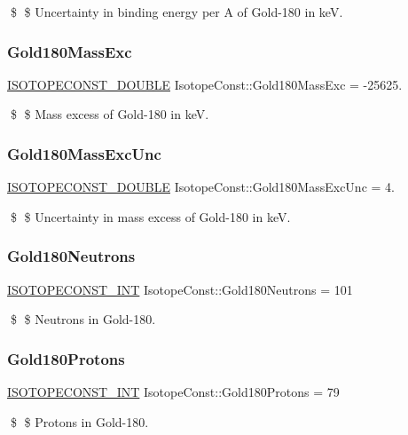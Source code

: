 \$ \$ Uncertainty in binding energy per A of Gold-\/180 in keV. \mbox{\label{group___isotope_const-_gold-_au180_gac93a89aab82e2ddeb1f7883011a1e968}} 
\subsubsection{\texorpdfstring{Gold180\+Mass\+Exc}{Gold180MassExc}}
{\footnotesize\ttfamily \mbox{\hyperlink{group___isotope_const-_macros_ga8f45a7272ce02c0b4c65c44636ed719a}{I\+S\+O\+T\+O\+P\+E\+C\+O\+N\+S\+T\+\_\+\+D\+O\+U\+B\+LE}} Isotope\+Const\+::\+Gold180\+Mass\+Exc = -\/25625.}

\$ \$ Mass excess of Gold-\/180 in keV. \mbox{\label{group___isotope_const-_gold-_au180_gad275b82ba2dd6ba87cdc403fe263988c}} 
\subsubsection{\texorpdfstring{Gold180\+Mass\+Exc\+Unc}{Gold180MassExcUnc}}
{\footnotesize\ttfamily \mbox{\hyperlink{group___isotope_const-_macros_ga8f45a7272ce02c0b4c65c44636ed719a}{I\+S\+O\+T\+O\+P\+E\+C\+O\+N\+S\+T\+\_\+\+D\+O\+U\+B\+LE}} Isotope\+Const\+::\+Gold180\+Mass\+Exc\+Unc = 4.}

\$ \$ Uncertainty in mass excess of Gold-\/180 in keV. \mbox{\label{group___isotope_const-_gold-_au180_gac6373d58975fd8445e00fe9d47a329a7}} 
\subsubsection{\texorpdfstring{Gold180\+Neutrons}{Gold180Neutrons}}
{\footnotesize\ttfamily \mbox{\hyperlink{group___isotope_const-_macros_ga5f18360b3e99483a35c32d789e62621c}{I\+S\+O\+T\+O\+P\+E\+C\+O\+N\+S\+T\+\_\+\+I\+NT}} Isotope\+Const\+::\+Gold180\+Neutrons = 101}

\$ \$ Neutrons in Gold-\/180. \mbox{\label{group___isotope_const-_gold-_au180_ga32c382cd87ec8e7c8225d2fb07df24ab}} 
\subsubsection{\texorpdfstring{Gold180\+Protons}{Gold180Protons}}
{\footnotesize\ttfamily \mbox{\hyperlink{group___isotope_const-_macros_ga5f18360b3e99483a35c32d789e62621c}{I\+S\+O\+T\+O\+P\+E\+C\+O\+N\+S\+T\+\_\+\+I\+NT}} Isotope\+Const\+::\+Gold180\+Protons = 79}

\$ \$ Protons in Gold-\/180. 